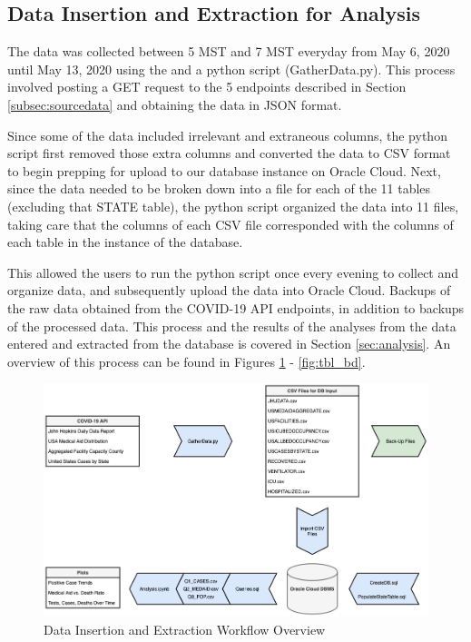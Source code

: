 \documentclass[11pt]{article}
\newcommand{\MYhref}[3][blue]{\href{#2}{\color{#1}{#3}}}%
\begin{document}
\subsection{Data Insertion and Extraction for Analysis}
\label{subsec:insertextract}

\noindent
The data was collected between 5 MST and 7 MST everyday from May 6, 2020 until May 13, 2020 using the \MYhref{https://www.npmjs.com/package/covid19-api}{Covid-19 API} and a python script (GatherData.py). This process involved posting a GET request to the 5 endpoints described in Section \ref{subsec:sourcedata} and obtaining the data in JSON format. 

\noindent
Since some of the data included irrelevant and extraneous columns, the python script first removed those extra columns and converted the data to CSV format to begin prepping for upload to our database instance on Oracle Cloud. Next, since the data needed to be broken down into a file for each of the 11 tables (excluding that STATE table), the python script organized the data into 11 files, taking care that the columns of each CSV file corresponded with the columns of each table in the instance of the database.

\noindent
This allowed the users to run the python script once every evening to collect and organize data, and subsequently upload the data into Oracle Cloud. Backups of the raw data obtained from the COVID-19 API endpoints, in addition to backups of the processed data. This process and the results of the analyses from the data entered and extracted from the database is covered in Section \ref{sec:analysis}. An overview of this process can be found in Figures \ref{fig:my_label} - \ref{fig:tbl_bd}.

\FloatBarrier
\begin{figure}[h]
    \centering
    \includegraphics[width=\textwidth]{diagrams/DataInsertionExtraction.png}
    \caption{Data Insertion and Extraction Workflow Overview}
    \label{fig:my_label}
\end{figure}
\FloatBarrier
\end{document}
